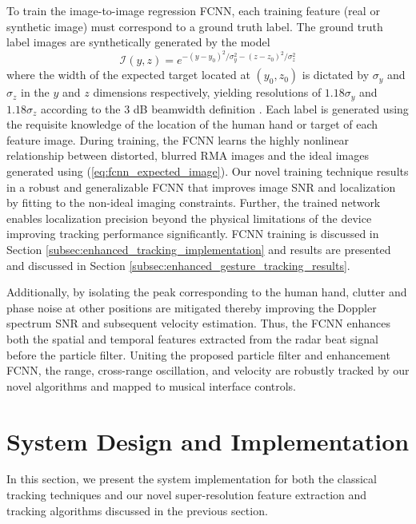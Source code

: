\documentclass[10pt,journal,final]{IEEEtran}
\begin{document}
To train the image-to-image regression FCNN, each training feature (real or synthetic image) must correspond to a ground truth label.
The ground truth label images are synthetically generated by the model
\begin{equation}
	\label{eq:fcnn_expected_image}
	\mathcal{I}(y,z) = e^{-(y - y_0)^2/\sigma_y^2 -(z - z_0)^2/\sigma_z^2}
\end{equation}
where the width of the expected target located at $(y_0,z_0)$ is dictated by $\sigma_y$ and $\sigma_z$ in the $y$ and $z$ dimensions respectively, yielding resolutions of $1.18\sigma_y$ and $1.18\sigma_z$ according to the $3$ dB beamwidth definition \cite{gao2018enhanced}. 
Each label is generated using the requisite knowledge of the location of the human hand or target of each feature image. 
During training, the FCNN learns the highly nonlinear relationship between distorted, blurred RMA images and the ideal images generated using (\ref{eq:fcnn_expected_image}).
Our novel training technique results in a robust and generalizable FCNN that improves image SNR and localization by fitting to the non-ideal imaging constraints. 
Further, the trained network enables localization precision beyond the physical limitations of the device improving tracking performance significantly.
FCNN training is discussed in Section \ref{subsec:enhanced_tracking_implementation} and results are presented and discussed in Section \ref{subsec:enhanced_gesture_tracking_results}.

Additionally, by isolating the peak corresponding to the human hand, clutter and phase noise at other positions are mitigated thereby improving the Doppler spectrum SNR and subsequent velocity estimation.
Thus, the FCNN enhances both the spatial and temporal features extracted from the radar beat signal before the particle filter.
Uniting the proposed particle filter and enhancement FCNN, the range, cross-range oscillation, and velocity are robustly tracked by our novel algorithms and mapped to musical interface controls.

\section{System Design and Implementation}
\label{sec:system_design_and_implementation}
In this section, we present the system implementation for both the classical tracking techniques and our novel super-resolution feature extraction and tracking algorithms discussed in the previous section.
\end{document}
